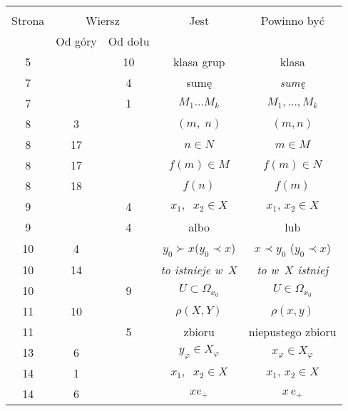 \documentclass[a4paper,11pt]{article}
\begin{document}
\vspace{\spaceFour}














\newpage



\begin{center}

  \begin{tabular}{|c|c|c|c|c|}
    \hline
    & \multicolumn{2}{c|}{} & & \\
    Strona & \multicolumn{2}{c|}{Wiersz} & Jest
                              & Powinno być \\ \cline{2-3}
    & Od góry & Od dołu & & \\
    \hline
    5   & & 10 & klasa grup & klasa \\
    7   & &  4 & sumę & \textit{sumę} \\
    7   & &  1 & $M_{ 1 } \ldots M_{ k }$ & $M_{ 1 }, \ldots, M_{ k }$ \\
    8   &  3 & & $( m,\; n )$ & $( m, n )$ \\
    8   & 17 & & $n \in N$ & $m \in M$ \\
    8   & 17 & & $f( m ) \in M$ & $f( m ) \in N$ \\
    8   & 18 & & $f( n )$ & $f( m )$ \\
    9   & &  4 & $x_{ 1 },\;\; x_{ 2 } \in X$ & $x_{ 1 },\, x_{ 2 } \in X$ \\
    9   & &  4 & albo & lub \\
    10  &  4 & & $y_{ 0 } \succ x$($y_{ 0 } \prec x$)
           & $x \prec y_{ 0 }$ ($y_{ 0 } \prec x$) \\
    10  & 14 & & \textit{to istnieje w~$X$} & \textit{to w~$X$ istniej} \\
    10  & &  9 & $U \subset \Omega_{ x_{ 0 } }$ & $U \in \Omega_{ x_{ 0 } }$ \\
    11  & 10 & & $\rho( X, Y )$ & $\rho( x, y )$ \\
    11  & &  5 & zbioru & niepustego zbioru \\
    13  &  6 & & $y_{ \varphi } \in X_{ \varphi }$ & $x_{ \varphi } \in X_{ \varphi }$ \\
    14  &  1 & & $x_{ 1 },\;\; x_{ 2 } \in X$ & $x_{ 1 },\, x_{ 2 } \in X$ \\
    14  &  6 & & $x e_{ + }$ & $x \, e_{ + }$ \\

\end{tabular}
\end{center}
\end{document}
